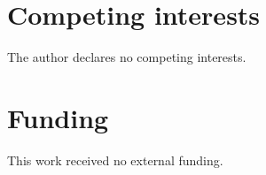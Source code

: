 \documentclass[11pt]{amsart}
\theoremstyle{definition}
\theoremstyle{remark}
\numberwithin{equation}{section}
\begin{document}
\section*{Competing interests}
The author declares no competing interests.

\section*{Funding}
This work received no external funding.

\raggedbottom
\begingroup\small\raggedright


\endgroup
\end{document}
